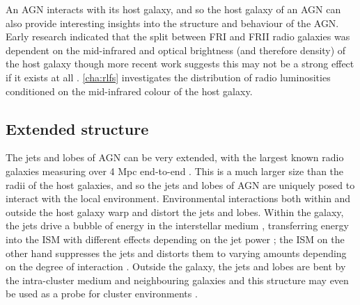         An AGN interacts with its host galaxy, and so the host galaxy of an AGN can also provide interesting insights into the structure and behaviour of the AGN. Early research indicated that the split between FRI and FRII radio galaxies was dependent on the mid-infrared and optical brightness (and therefore density) of the host galaxy \citep{ledlow_20_1996,bicknell_relativistic_1995} though more recent work suggests this may not be a strong effect if it exists at all \citep{hardcastle_radio_2020}. \autoref{cha:rlfs} investigates the distribution of radio luminosities conditioned on the mid-infrared colour of the host galaxy.

    \subsection{Extended structure}
    \label{sec:extended-structure-of-agn}

        The jets and lobes of AGN can be very extended, with the largest known radio galaxies measuring over 4 Mpc end-to-end \citep{machalski_understanding_2011}. This is a much larger size than the radii of the host galaxies, and so the jets and lobes of AGN are uniquely posed to interact with the local environment. Environmental interactions both within and outside the host galaxy warp and distort the jets and lobes. Within the galaxy, the jets drive a bubble of energy in the interstellar medium \citep[ISM;][]{mukherjee_relativistic_2016}, transferring energy into the ISM with different effects depending on the jet power \citep{mukherjee_relativistic_2018}; the ISM on the other hand suppresses the jets and distorts them to varying amounts depending on the degree of interaction \citep{mukherjee_relativistic_2018}. Outside the galaxy, the jets and lobes are bent by the intra-cluster medium and neighbouring galaxies \citep[ICM;][]{garon19bending,rodman_radio_2019} and this structure may even be used as a probe for cluster environments \citep{banfield_radio_2016,sakelliou_3c40_2008}.


